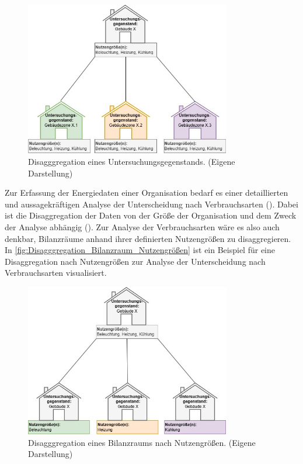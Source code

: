 \begin{figure}[H]
    \centering
    \includegraphics[width=0.8\textwidth]{../../Ressourcen/Abbildungen/Untersuchungsgegenstand_Zerlegt.jpg}
    \caption{Disagggregation eines Untersuchungsgegenstands. (Eigene Darstellung)}
    \label{fig:Disagggregation_Bilanzraum_Untersuchungsgegenstand}
\end{figure}

Zur Erfassung der Energiedaten einer Organisation bedarf es einer detaillierten und aussagekräftigen Analyse der Unterscheidung nach Verbrauchsarten 
(\cite[S. 14]{Hohnhold.2013}). Dabei ist die Disaggregation der Daten von der Größe der Organisation und dem Zweck der Analyse abhängig (\cite[S. 14f.]{Hohnhold.2013}).
Zur Analyse der Verbrauchsarten wäre es also auch denkbar, Bilanzräume anhand ihrer definierten Nutzengrößen zu disaggregieren.
In \eqref{fig:Disagggregation_Bilanzraum_Nutzengrößen} ist ein Beispiel für eine Disaggregation nach Nutzengrößen 
zur Analyse der Unterscheidung nach Verbrauchsarten visualisiert.

\begin{figure}[H]
    \centering
    \includegraphics[width=0.8\textwidth]{../../Ressourcen/Abbildungen/Nutzengröße_Bewertungseinheit_Zerlegt.jpg}
    \caption{Disagggregation eines Bilanzraums nach Nutzengrößen. (Eigene Darstellung)}
    \label{fig:Disagggregation_Bilanzraum_Nutzengrößen}
\end{figure}